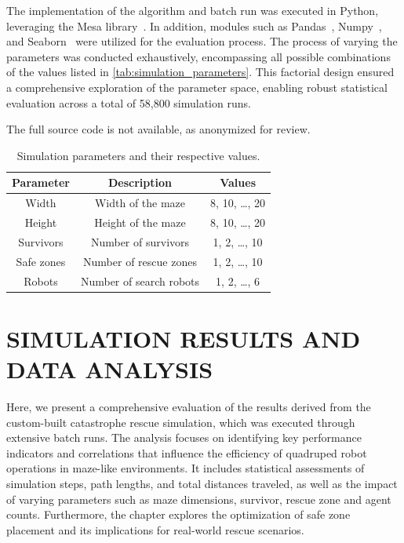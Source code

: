 \documentclass[a4paper,twoside]{article}
\begin{document}
The implementation of the algorithm and batch run was executed in Python, leveraging the Mesa library\ \cite{Hoeven2025mesa}.
In addition, modules such as Pandas\ \cite{thepandas2025pandas,mckinney-proc-scipy-2010}, Numpy\ \cite{harris2020array}, and Seaborn\ \cite{Waskom2021seaborn} were utilized for the evaluation process.
The process of varying the parameters was conducted exhaustively, encompassing all possible combinations of the values listed in \autoref{tab:simulation_parameters}. This factorial design ensured a comprehensive exploration of the parameter space, enabling robust statistical evaluation across a total of 58,800 simulation runs.

The full source code is not available, as anonymized for review.


\begin{table}[!htb]
    \caption{Simulation parameters and their respective values.}\label{tab:simulation_parameters}\centering
    \begin{tabular}{|c|c|c|}
        \hline
        \textbf{Parameter} & \textbf{Description} & \textbf{Values} \\ \hline
        Width    & Width of the maze         & 8, 10, \ldots, 20 \\ \hline
        Height   & Height of the maze        & 8, 10, \ldots, 20 \\ \hline
        Survivors & Number of survivors       & 1, 2, \ldots, 10 \\ \hline
        Safe zones & Number of rescue zones    & 1, 2, \ldots, 10 \\ \hline
        Robots   & Number of search robots   & 1, 2, \ldots, 6  \\ \hline
    \end{tabular}
\end{table}


\section{\uppercase{Simulation Results and Data Analysis}}
\label{sec:data_analysis}
Here, we present a comprehensive evaluation of the results derived from the custom-built catastrophe rescue simulation, which was executed through extensive batch runs. The analysis focuses on identifying key performance indicators and correlations that influence the efficiency of quadruped robot operations in maze-like environments. It includes statistical assessments of simulation steps, path lengths, and total distances traveled, as well as the impact of varying parameters such as maze dimensions, survivor, rescue zone and agent counts. Furthermore, the chapter explores the optimization of safe zone placement and its implications for real-world rescue scenarios. 
\end{document}
